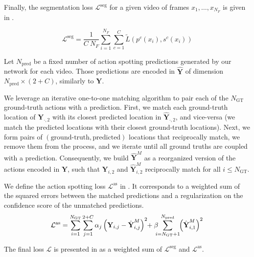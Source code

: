 \documentclass[10pt,twocolumn,letterpaper]{article}
\begin{document}
Finally, the segmentation loss $\mathcal{L}^\text{seg}$ for a given video of frames $x_1,\ldots, x_{N_F}$ is given in .


\begin{equation}\label{eq:seg_loss}
    \mathcal{L}^\text{seg} = \frac{1}{C \ N_F}\sum_{i = 1}^{N_F} \sum_{c=1}^C \tilde{L}(p^c(x_i),s^c(x_i))
\end{equation}


Let $N_\text{pred}$ be a fixed number of action spotting predictions generated by our network for each video. Those predictions are encoded in $\hat{\textbf{Y}}$ of dimension $N_\text{pred} \times (2+C)$, similarly to $\textbf{Y}$. 


We leverage an iterative one-to-one matching algorithm to pair each of the $N_\text{GT}$ ground-truth actions with a prediction. First, we match each ground-truth location of $\textbf{Y}_{\cdot,2}$ with its closest predicted location in $\hat{\textbf{Y}}_{\cdot,2}$, and vice-versa (\ie we match the predicted locations with their closest ground-truth locations). Next, we form pairs of $(\text{ground-truth}, \text{predicted})$ locations that reciprocally match, we remove them from the process, and we iterate until all ground truths are coupled with a prediction. Consequently, we build $\hat{\textbf{Y}}^M$ as a reorganized version of the actions encoded in $\hat{\textbf{Y}}$, such that $\textbf{Y}_{i,2}$ and $\hat{\textbf{Y}}^M_{i,2}$ reciprocally match for all $i\leq N_\text{GT}$.


We define the action spotting loss $\mathcal{L}^\text{as}$ in . It corresponds to a weighted sum of the squared errors between the matched predictions and a regularization on the confidence score of the unmatched predictions.
\begin{equation}
    \hspace{-0.5mm}\mathcal{L}^\text{as} = \sum_{i=1}^{N_\text{GT}}\sum_{j=1}^{2+C}\alpha_j \left(\textbf{Y}_{i,j}-\hat{\textbf{Y}}^M_{i,j}\right)^2 \hspace{-1mm}+ \beta \hspace{-2mm}\sum_{i=N_\text{GT}+1}^{N_\text{pred}} \hspace{-1mm}\left(\hat{\textbf{Y}}^M_{i,1}\right)^2
    \label{eq:LossActionSpotting}
\end{equation}



The final loss $\mathcal{L}$ is presented in  as a weighted sum of $\mathcal{L}^\text{seg}$ and $\mathcal{L}^\text{as}$.
\end{document}
